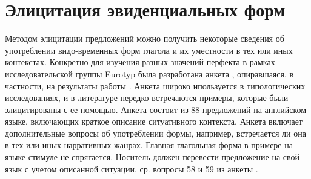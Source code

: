 \section{Элицитация эвиденциальных форм} \label{sec:elicitation}

Методом элицитации предложений можно получить некоторые сведения об употреблении видо-временных форм глагола и их уместности в тех или иных контекстах. Конкретно для изучения разных значений перфекта в рамках исследовательской группы Eurotyp была разработана анкета \citep{dahl2000}, опиравшаяся, в частности, на результаты работы \citep{dahl1985}. Анкета широко ипользуется в типологических исследованиях, и в литературе нередко встречаются примеры, которые были элицитированы с ее помощью. Анкета состоит из 88 предложений на английском языке, включающих краткое описание ситуативного контекста. Анкета включает дополнительные вопросы об употреблении формы, например, встречается ли она в тех или иных нарративных жанрах. Главная глагольная форма в примере на языке-стимуле не спрягается. Носитель должен перевести предложение на свой язык с учетом описанной ситуации, ср. вопросы 58 и 59 из анкеты \citep[804]{dahl2000}.



